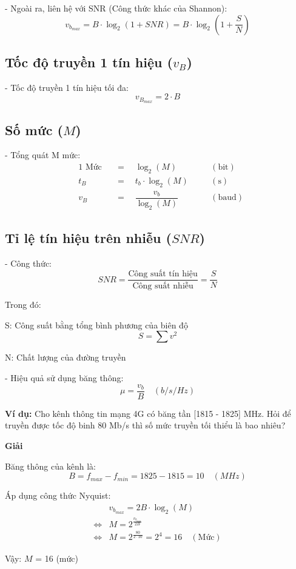 - Ngoài ra, liên hệ với SNR (Công thức khác của Shannon):
\[
    \boxed{
        v_{b_{max}} = B \cdot \log_2 (1 + SNR) = B \cdot \log_2 \left( 1 + \dfrac{S}{N} \right)
    }
\]

\subsection{Tốc độ truyền 1 tín hiệu ($v_B$)}
- Tốc độ truyền 1 tín hiệu tối đa:
\[
    \boxed{
        v_{B_{max}} = 2 \cdot B
    }
\]

\subsection{Số mức ($M$)}
- Tổng quát M mức:
\[
    \boxed{
        \begin{aligned}
            &1 \text{ Mức} &&= \quad \log_2 (M) \quad &&(\text{bit})\\[6pt]
            &t_B &&= \quad t_b \cdot \log_2 (M) \quad &&(\text{s})\\[6pt]
            &v_B &&= \quad \dfrac{v_b}{\log_2 (M)} \quad &&(\text{baud})
        \end{aligned}   
    }
\]

\subsection{Tỉ lệ tín hiệu trên nhiễu ($SNR$)}
- Công thức:
\[
    \boxed{SNR = \dfrac{\text{Công suất tín hiệu}}{\text{Công suất nhiễu}} = \dfrac{S}{N}}
\]

\noindent\hspace*{2cm}Trong đó:

\noindent\hspace*{2.5cm}S: Công suất bằng tổng bình phương của biên độ
\[
    \boxed{
        S = \sum v^2
    }
\]

\noindent\hspace*{2.5cm}N: Chất lượng của đường truyền

- Hiệu quả sử dụng băng thông:
\[
    \boxed{\mu = \dfrac{v_b}{B}} \quad (b/s/Hz)
\]

\noindent\textbf{Ví dụ:} Cho kênh thông tin mạng 4G có băng tần [1815 - 1825] MHz. Hỏi để truyền được tốc độ binh 80 Mb/s thì số mức truyền tối thiểu là bao nhiêu?
\begin{center}
    \textbf{Giải}
\end{center}

Băng thông của kênh là:
\[
    B = f_{max} - f_{min} = 1825 -1815 = 10 \quad (MHz)
\]

Áp dụng công thức Nyquist:
\[
    \begin{aligned}
        &v_{b_{max}} = 2B \cdot \log_2 (M)\\[6pt]
        \iff &M = 2^{ \frac{v_{b_{max}}}{2B}}\\[6pt]
        \iff &M = 2^{ \frac{80}{2 \cdot 10} } = 2^4 = 16 \quad (\text{Mức}) 
    \end{aligned} 
\]

Vậy: $M$ = 16 (mức)
